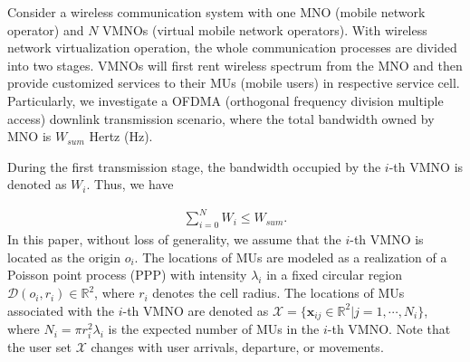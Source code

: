 \documentclass[journal]{IEEEtran}
\begin{document}
Consider a wireless communication system with one MNO (mobile network operator) and $N$ VMNOs (virtual mobile network operators). With wireless network virtualization operation, the whole communication processes are divided into two stages. VMNOs will first rent wireless spectrum from the MNO and then provide customized services to their MUs (mobile users) in respective service cell. Particularly, we investigate a OFDMA (orthogonal frequency division multiple access) downlink transmission scenario, where the total bandwidth owned by MNO is $W_{sum}$ Hertz (Hz). 

During the first transmission stage, the bandwidth occupied by the $i$-th VMNO is denoted as $W_i$. Thus, we have

\begin{align}
\sum_{i = 0}^{N} W_i \leq W_{sum}.
\end{align}
In this paper, without loss of generality, we assume that the $i$-th VMNO is located as the origin $o_i$. The locations of MUs are modeled as a realization of a Poisson point process (PPP) with intensity $\lambda_i$ in a fixed circular region $\mathcal{D}(o_i, r_i) \in \mathbb{R}^2$, where $r_i$ denotes the cell radius. The locations of MUs associated with the $i$-th VMNO are denoted as $\mathcal{X} = \{\mathbf{x}_{ij} \in \mathbb{R}^2 | j = 1, \cdots, N_i\}$, where $N_i = \pi r_i^2 \lambda_i$ is the expected number of MUs in the $i$-th VMNO. Note that the user set $\mathcal{X}$ changes with user arrivals, departure, or movements.
\end{document}
